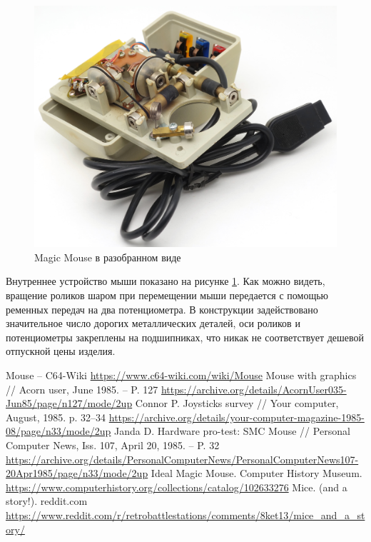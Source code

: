 \documentclass[11pt, a4paper]{article}
\begin{document}
 \begin{figure}[h]
    \centering
    \includegraphics[scale=0.65]{1985_smc_contriver_magic_mouse/inside_30.jpg}
    \caption{Magic Mouse в разобранном виде}
    \label{fig:MagicMouseInside}
\end{figure}

Внутреннее устройство мыши показано на рисунке \ref{fig:MagicMouseInside}. Как можно видеть, вращение роликов шаром при перемещении мыши передается с помощью ременных передач на два потенциометра. В конструкции задействовано значительное число дорогих металлических деталей, оси роликов и потенциометры закреплены на подшипниках, что никак не соответствует дешевой отпускной цены изделия.

\begin{thebibliography}{9}
 Mouse -- C64-Wiki \url{https://www.c64-wiki.com/wiki/Mouse}
 Mouse with graphics // Acorn user, June 1985. -- P. 127 \url{https://archive.org/details/AcornUser035-Jun85/page/n127/mode/2up}
 Connor P. Joysticks survey // Your computer, August, 1985. p. 32--34 \url{https://archive.org/details/your-computer-magazine-1985-08/page/n33/mode/2up}
 Janda D. Hardware pro-test: SMC Mouse // Personal Computer News, Iss. 107, April 20, 1985. -- P. 32 \url{https://archive.org/details/PersonalComputerNews/PersonalComputerNews107-20Apr1985/page/n33/mode/2up}
 Ideal Magic Mouse. Computer History Museum. \url{https://www.computerhistory.org/collections/catalog/102633276}
 Mice. (and a story!). reddit.com
 \url{https://www.reddit.com/r/retrobattlestations/comments/8ket13/mice_and_a_story/}
\end{thebibliography}
\end{document}
